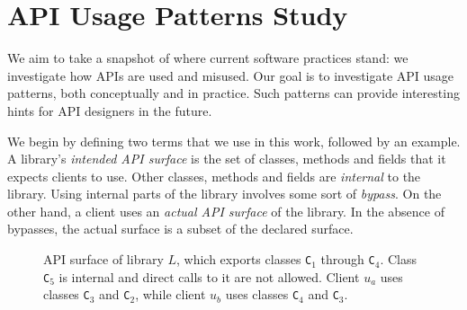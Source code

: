 \chapter{API Usage Patterns Study}
\label{sec:apiusage}
We aim to take a snapshot of where current software practices stand: we investigate how APIs are used and misused. Our goal is to investigate API usage patterns, both conceptually and in practice.
Such patterns can provide interesting hints for API designers in the future.

We begin by defining two terms that we use in this work, followed by an example. 
A library's \emph{intended API surface} is the set of
classes, methods and fields that it expects clients to use. Other
classes, methods and fields are \emph{internal} to the library. Using
internal parts of the library involves some sort of \emph{bypass}. On
the other hand, a client uses an \emph{actual API surface} of the
library. In the absence of bypasses, the actual surface is a subset of
the declared surface.


\begin{figure}[h]
 \begin{center}
  \caption{API surface of library $L$, which exports classes \texttt{C}$_1$ through \texttt{C}$_4$. Class \texttt{C}$_5$ is internal and direct calls to it are not allowed. Client $u_a$ uses classes \texttt{C}$_3$ and \texttt{C}$_2$, while client $u_b$ uses classes \texttt{C}$_4$ and \texttt{C}$_3$.}
  \label{fig:api-surface}
 \end{center}
\end{figure}


